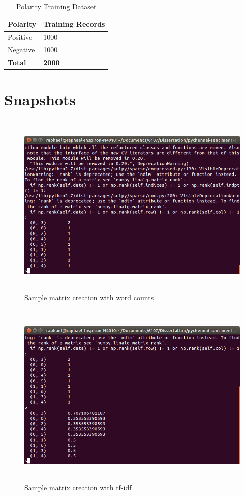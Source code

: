 \documentclass[oneside,a4paper,12pt]{pictreport}
\begin{document}
\renewcommand{\arraystretch}{1.5}

\begin{table}[h!]
\centering
\caption{Polarity Training Dataset}
\label{my-label}
\begin{tabular}{|l|l|}
\hline
\textbf{Polarity} & \textbf{Training Records} \\ \hline
Positive          & 1000                      \\ \hline
Negative          & 1000                      \\ \hline

\textbf{Total}    & \textbf{2000}             \\ \hline
\end{tabular}
\end{table}

\newpage
\section{Snapshots}


\begin{figure}[!h]
\includegraphics[width=5.5in,height=3.5in]{screenshot2.png}
\caption{Sample matrix creation with word counts}
\end{figure}

\begin{figure}[!h]
\includegraphics[width=5.5in,height=3.5in]{screenshot3.png}
\caption{Sample matrix creation with tf-idf}
\end{figure}
\end{document}
